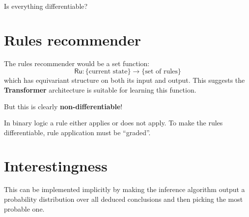 Is everything differentiable?

\section{Rules recommender}

The rules recommender would be a set function:
\begin{equation}
\mathsf{Ru}: \{ \mbox{current state} \} \rightarrow \{ \mbox{set of rules} \}
\end{equation}
which has equivariant structure on both its input and output.  This suggests the \textbf{Transformer} architecture is suitable for learning this function.

But this is clearly \textbf{non-differentiable}!  

In binary logic a rule either applies or does not apply.  To make the rules differentiable, rule application must be ``graded''.  

\section{Interestingness}

This can be implemented implicitly by making the inference algorithm output a probability distribution over all deduced conclusions and then picking the most probable one.

